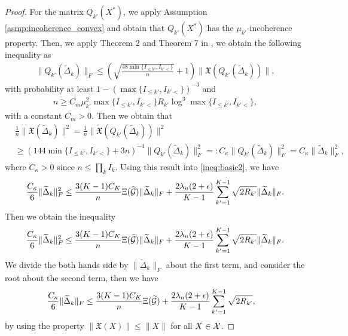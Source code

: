 \begin{proof}
For the matrix $Q_{k'}(X^*)$, we apply Assumption \ref{asmp:incoherence_convex} and obtain that $Q_{k'}(X^*)$ has the $\mu_{k'}$-incoherence property.
Then, we apply Theorem 2 and Theorem 7 in \cite{candes2010matrix}, we obtain the following inequality as
\begin{align*}
	\|Q_{k'}(\tilde{\Delta}_{k})\|_F \leq \left(  \sqrt{\frac{48  \min\{I_{\leq k'}, I_{k'<}\}}{n}}+ 1 \right) \|\mathfrak{X}(Q_{k'}(\tilde{\Delta}_{k}))\|,
\end{align*}
with probability at least $1-( \max\{I_{\leq k'}, I_{k'<}\})^{-3}$ and
\begin{align*}
	n \geq C_{m} \mu_{k'}^2  \max\{I_{\leq k'}, I_{k'<}\} R_{k'} \log^3  \max\{I_{\leq k'}, I_{k'<}\},
\end{align*}
with a constant $C_m > 0$.
Then we obtain that
\begin{align*}
	&\frac{1}{n}\|\mathfrak{X}(\tilde{\Delta}_k)\|^2 = \frac{1}{n}\|\tilde{\mathfrak{X}}(Q_{k'}(\tilde{\Delta}_k))\|^2 \\
	& \geq (144  \min\{I_{\leq k'}, I_{k'<}\} + 3n)^{-1} \|Q_{k'}(\tilde{\Delta}_k)\|_F^2 =: C_{\kappa} \|Q_{k'}(\tilde{\Delta}_k)\|_F^2 = C_{\kappa} \|\tilde{\Delta}_k\|_F^2,
\end{align*}
where $C_{\kappa} > 0$ since $n \leq \prod_k I_k$.
Using this result into \eqref{ineq:basic2}, we have
\begin{align*}
	\frac{C_{\kappa}}{6} \|\widetilde{\Delta}_k\|_F^2 \leq \frac{3(K-1)C_K}{n}\Xi(\widetilde{\mathcal{G}}) \|\widetilde{\Delta}_k\|_F + \frac{2 \lambda_n (2+\epsilon)}{K-1}\sum_{k'=1}^{K-1} \sqrt{2R_{k'}}  \|\widetilde{\Delta}_k\|_F.
\end{align*}
Then we obtain the inequality
\begin{align*}
	\frac{C_{\kappa}}{6} \|\widetilde{\Delta}_k\|_F^2 \leq \frac{3(K-1)C_K}{n}\Xi(\widetilde{\mathcal{G}}) \|\widetilde{\Delta}_k\|_F + \frac{2 \lambda_n (2+\epsilon) }{K-1}\sum_{k'=1}^{K-1} \sqrt{2R_{k'}}  \|\widetilde{\Delta}_k\|_F.
\end{align*}
We divide the both hands side by $\|\tilde{\Delta}_k\|_F$ about the first term, and consider the root about the second term, then we have
\begin{align}
	\frac{C_{\kappa}}{6} \|\widetilde{\Delta}_k\|_F & \leq \frac{3(K-1)C_K}{n}  \Xi(\widetilde{\mathcal{G}}) + \frac{2 \lambda_n (2+\epsilon)}{K-1}\sum_{k'=1}^{K-1} \sqrt{2R_{k'}},  \label{ineq:basic5}
\end{align}
by using the property $\|\mathfrak{X}(X)\| \leq \|X\|$ for all $X \in \mathcal{X}$.



\end{proof}
